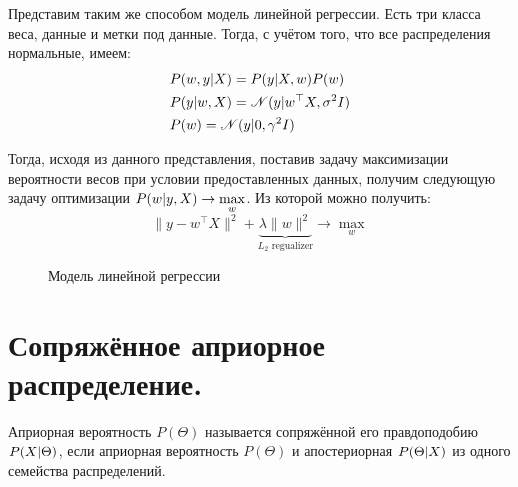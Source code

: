 Представим таким же способом модель линейной регрессии. Есть три класса веса, данные и метки под данные. Тогда, с учётом того, что все распределения нормальные, имеем:
\begin{align*}
& P(w, y \arrowvert X) = P(y \arrowvert X, w) P(w) \\
& P(y \arrowvert w, X) = \mathscr{N}(y \arrowvert w^\top X, \sigma^2 I) \\
& P(w)=\mathscr{N}(y \arrowvert 0, \gamma^2 I) \\
\end{align*}

Тогда, исходя из данного представления, поставив задачу максимизации вероятности весов при условии предоставленных данных,  получим следующую задачу оптимизации $P(w \arrowvert y, X) \rightarrow \max\limits_{w}^{} $. Из которой можно получить:
$$
	\|y - w^\top X\|^2 + \underbrace{\lambda \|w\|^2}_{L_2 \text{ regualizer}} \rightarrow \max\limits_{w}^{}
$$

\begin{figure}[H]
	\caption{Модель линейной регрессии}
\end{figure}
\newpage

\section{Сопряжённое априорное распределение.}
Априорная вероятность $P(\Theta)$ называется сопряжённой его правдоподобию $P(X \arrowvert \Theta)$, если априорная вероятность $P(\Theta)$ и апостериорная $P(\Theta \arrowvert X)$ из одного семейства распределений.

